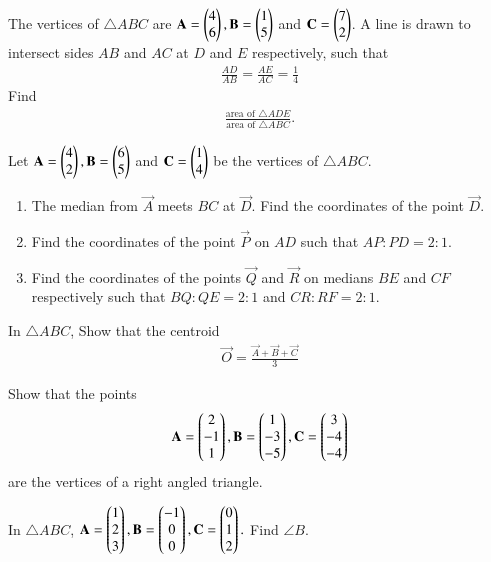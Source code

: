 %
\item The vertices of $\triangle ABC$ are $\mathbf{A}=\begin{pmatrix}4\\6\end{pmatrix},  \mathbf{B}=\begin{pmatrix}1\\5\end{pmatrix}$ and  $\mathbf{C} =  \begin{pmatrix}7\\2\end{pmatrix}$.  A line is drawn to intersect sides $AB$ and $AC$ at $D$ and $E$ respectively, such that
\begin{align}
\frac{AD}{AB}=\frac{AE}{AC}= \frac{1}{4}
\end{align}
%
Find 
\begin{align}
\frac{\text{area of }\triangle ADE}{\text{area of }\triangle ABC}.
\end{align}
\item Let $\mathbf{A}=\begin{pmatrix}4\\2\end{pmatrix},  \mathbf{B}=\begin{pmatrix}6\\5\end{pmatrix}$ and  $\mathbf{C} =  \begin{pmatrix}1\\4\end{pmatrix}$ be the vertices of $\triangle ABC$.
\begin{enumerate}
\item The median from $\vec{A}$ meets $BC$ at $\vec{D}$.  Find the coordinates of the point $\vec{D}$.
\item Find the coordinates of the point $\vec{P}$ on $AD$ such that $AP:PD = 2:1$.
\item Find the coordinates of the points $\vec{Q}$ and $\vec{R}$ on medians $BE$ and $CF$ respectively such that $BQ:QE = 2:1$ and $CR:RF = 2:1$.
\end{enumerate}
\solution

\item In $\triangle ABC$, Show that the centroid 
\begin{align}
\vec{O} = \frac{\vec{A}+\vec{B}+\vec{C}}{3}
\end{align}
\item Show that the points 
\begin{align}
\mathbf{A} = \begin{pmatrix}2\\-1 \\1\end{pmatrix},
\mathbf{B} = \begin{pmatrix}1\\-3 \\-5\end{pmatrix},
\mathbf{C} = \begin{pmatrix}3\\ -4\\-4\end{pmatrix}
\end{align}
%
are the vertices of a right angled triangle.
\item In $\triangle ABC$, 
$
\mathbf{A} = \begin{pmatrix}1\\2 \\3\end{pmatrix},
\mathbf{B} = \begin{pmatrix}-1\\0 \\0\end{pmatrix},
\mathbf{C} = \begin{pmatrix}0\\ 1\\2\end{pmatrix}.
$
Find $\angle B$.
\\
\solution


